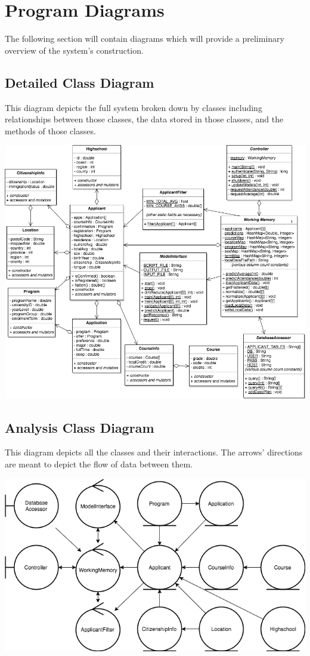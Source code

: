 \documentclass[titlepage]{article}
\begin{document}
\section{Program Diagrams}
The following section will contain diagrams which will provide a preliminary overview of the system's construction.
\subsection{Detailed Class Diagram}
This diagram depicts the full system broken down by classes including relationships between those classes, the data stored in those classes, and the methods of those classes.\\[10mm]
\begin{center}
	\includegraphics[width=1.05\textwidth]{AdvolDetailedClassDiagram.png}
\label{fig:detailed class diagram}
\end{center}
\newpage
\subsection{Analysis Class Diagram}
This diagram depicts all the classes and their interactions. The arrows' directions are meant to depict the flow of data between them.\\[10mm]
\begin{center}
	\includegraphics[width=\textwidth]{AdvolAnalysisClassDiagram.png}
\label{fig:analysis class diagram}
\end{center}
\newpage
\end{document}
